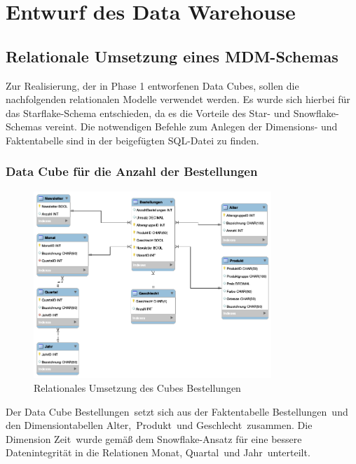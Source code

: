 \section{Entwurf des Data Warehouse}
\subsection{Relationale Umsetzung eines MDM-Schemas}
Zur Realisierung, der in Phase 1 entworfenen Data Cubes, sollen die nachfolgenden relationalen Modelle verwendet werden. Es wurde sich hierbei für das Starflake-Schema entschieden, da es die Vorteile des Star- und Snowflake-Schemas vereint. Die notwendigen Befehle zum Anlegen der Dimensions- und Faktentabelle sind in der beigefügten SQL-Datei zu finden. 

\subsubsection{Data Cube für die Anzahl der Bestellungen}
\begin{figure}[htbp] 
    \centering
       \includegraphics[width=0.8\textwidth]{phase2/dwh-bestellungen.png}
    \caption{Relationales Umsetzung des Cubes \glqq Bestellungen\grqq}
    \label{fig:bestellungen}
  \end{figure} 
   
Der Data Cube \glqq Bestellungen\grqq ~setzt sich aus der Faktentabelle \glqq Bestellungen\grqq ~und den Dimensiontabellen \glqq Alter\grqq ,~\glqq Produkt\grqq ~und \glqq Geschlecht\grqq ~zusammen. Die Dimension \glqq Zeit\grqq ~wurde gemäß dem Snowflake-Ansatz für eine bessere Datenintegrität in die Relationen \glqq Monat\grqq , \glqq Quartal\grqq ~und \glqq Jahr\grqq ~unterteilt.
\pagebreak

